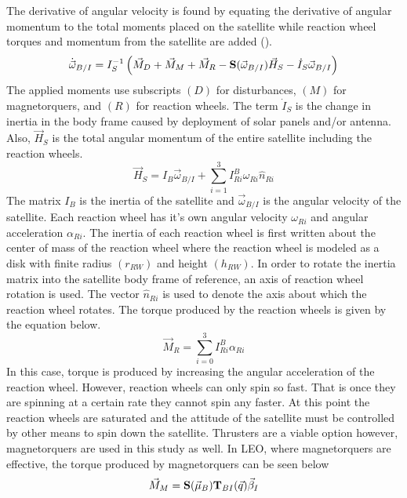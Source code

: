 \documentclass[conf]{new-aiaa}
\begin{document}
The derivative of angular velocity is found by equating the derivative of angular momentum to the total moments placed on the satellite while reaction wheel torques and momentum from the satellite are added (\cite{etkins}).
\begin{equation}\label{e:pqrdot}
      \dot{\vec{\omega}}_{B/I} = I_S^{-1}\left(\vec{M}_D + \vec{M}_{M} + \vec{M}_R - {\bf S}(\vec{\omega}_{B/I}) \vec{H}_{S} - \dot{I}_S\vec{\omega}_{B/I}\right)
\end{equation}
The applied moments use subscripts $(D)$ for disturbances, $(M)$ for magnetorquers, and $(R)$ for reaction wheels. The term $\dot{I}_S$ is the change in inertia in the body frame caused by deployment of solar panels and/or antenna. Also, $\vec{H}_S$ is the total angular momentum of the entire satellite including the reaction wheels.
\begin{equation}
  \vec{H}_S = I_B\vec{\omega}_{B/I} + \sum\limits_{i=1}^3
  I^{B}_{Ri}\omega_{Ri}\hat{n}_{Ri}
\end{equation}
The matrix $I_{B}$ is the inertia of the satellite and $\vec{\omega}_{B/I}$ is the angular velocity of the satellite. Each reaction wheel has it's own angular velocity $\omega_{Ri}$ and angular acceleration $\alpha_{Ri}$. The inertia of each reaction wheel is first written about the center of mass of the reaction wheel where the reaction wheel is modeled as a disk with finite radius $(r_{RW})$ and height $(h_{RW})$. In order to rotate the inertia matrix into the satellite body frame of reference, an axis of reaction wheel rotation is used. The vector
$\hat{n}_{Ri}$ is used to denote the axis about which the reaction
wheel rotates. The torque produced by the reaction wheels is given by the equation below.
\begin{equation}
    \vec{M}_R = \sum\limits_{i=0}^3 I^B_{Ri}\alpha_{Ri}
\end{equation}
In this case, torque is produced by increasing the angular acceleration of the reaction wheel. However, reaction wheels can only spin so fast. That is once they are spinning at a certain rate they cannot spin any faster. At this point the reaction wheels are saturated and the attitude of the satellite must be controlled by other means to spin down the satellite. Thrusters are a viable option however, magnetorquers are used in this study as well. In LEO, where magnetorquers are effective, the torque produced by magnetorquers can be seen below
\begin{equation}
    \vec{M}_M = {\bf S}(\vec{\mu}_B){\bf T}_{BI}(\vec{q})\vec{\beta}_I
\end{equation}
\end{document}
